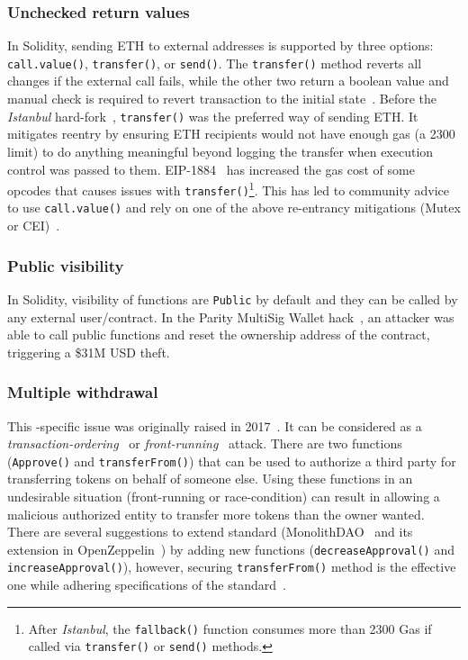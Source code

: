 \subsubsection{Unchecked return values}
In Solidity, sending ETH to external addresses is supported by three options: \texttt{call.value()}, \texttt{transfer()}, or \texttt{send()}. The \texttt{transfer()} method reverts all changes if the external call fails, while the other two return a boolean value and manual check is required to revert transaction to the initial state~\cite{SoliditySendEther}. Before the \textit{Istanbul} hard-fork~\cite{IstanbulUpgrades}, \texttt{transfer()} was the preferred way of sending ETH. It mitigates reentry by ensuring ETH recipients would not have enough gas (\ie a 2300 limit) to do anything meaningful beyond logging the transfer when execution control was passed to them. EIP-1884~\cite{EIP1884} has increased the gas cost of some opcodes that causes issues with \texttt{transfer()}\footnote{After \textit{Istanbul}, the \texttt{fallback()} function consumes more than 2300 Gas if called via \texttt{transfer()} or \texttt{send()} methods.}. This has led to community advice to use \texttt{call.value()} and rely on one of the above re-entrancy mitigations (\ie Mutex or CEI)~\cite{ConsensysStopTran,ChainSecurity}.

\subsubsection{Public visibility}

In Solidity, visibility of functions are \texttt{Public} by default and they can be called by any external user/contract. In the Parity MultiSig Wallet hack~\cite{ParityFirstHack}, an attacker was able to call public functions and reset the ownership address of the contract, triggering a \$31M USD theft.

\subsubsection{Multiple withdrawal}

This \erc-specific issue was originally raised in 2017~\cite{MikVlad,TomHale}. It can be considered as a \textit{transaction-ordering}~\cite{OrderingAttack} or \textit{front-running}~\cite{eskandari2019sok} attack. There are two \erc functions (\ie \texttt{Approve()} and \texttt{transferFrom()}) that can be used to authorize a third party for transferring tokens on behalf of someone else. Using these functions  in an undesirable situation (\ie front-running or race-condition) can result in allowing a malicious authorized entity to transfer more tokens than the owner wanted. There are several suggestions to extend \erc standard (\eg MonolithDAO~\cite{MonolithDAO} and its extension in OpenZeppelin~\cite{OpenZepplin}) by adding new functions (\ie \texttt{decreaseApproval()} and \texttt{increaseApproval()}), however, securing \texttt{transferFrom()} method is the effective one while adhering specifications of the \erc standard~\cite{ERC20MWA}.

